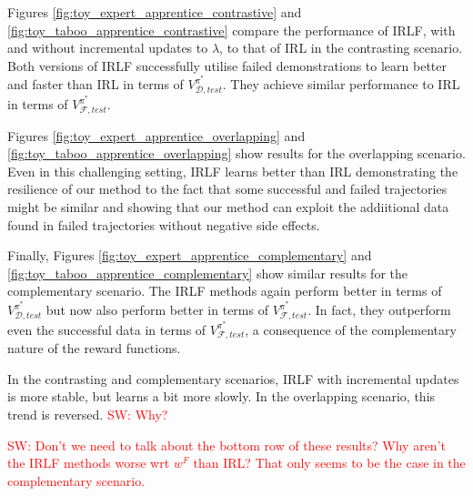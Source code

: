 \documentclass{aamas2016}
\newcommand{\sw}[1]{\textcolor{red}{SW: #1}}
\newcommand{\sw}[1]{}
\begin{document}
Figures \ref{fig:toy_expert_apprentice_contrastive} and \ref{fig:toy_taboo_apprentice_contrastive} compare the performance of IRLF, with and without incremental updates to $\lambda$, to that of IRL in the contrasting scenario. Both versions of IRLF successfully utilise failed demonstrations to learn better and faster than IRL in terms of $V^{\pi^*}_{\mathcal{D},test}$.  They achieve similar performance to IRL in terms of $V^{\pi^*}_{\mathcal{F},test}$.  

Figures \ref{fig:toy_expert_apprentice_overlapping} and \ref{fig:toy_taboo_apprentice_overlapping} show results for the overlapping scenario. Even in this challenging setting, IRLF learns better than IRL demonstrating the resilience of our method to the fact that some successful and failed trajectories might be similar and showing that our method can exploit the addiitional data found in failed trajectories without negative side effects. 

Finally, Figures \ref{fig:toy_expert_apprentice_complementary} and \ref{fig:toy_taboo_apprentice_complementary} show similar results for the complementary scenario.  The IRLF methods again perform better in terms of $V^{\pi^*}_{\mathcal{D},test}$ but now also perform better in terms of $V^{\pi^*}_{\mathcal{F},test}$.  In fact, they outperform even the successful data in terms of $V^{\pi^*}_{\mathcal{F},test}$, a consequence of the complementary nature of the reward functions.  

In the contrasting and complementary scenarios, IRLF with incremental updates is more stable, but learns a bit more slowly.  In the overlapping scenario, this trend is reversed.  \sw{Why?}

\sw{Don't we need to talk about the bottom row of these results?  Why aren't the IRLF methods worse wrt $w^F$ than IRL?  That only seems to be the case in the complementary scenario.}
\end{document}
